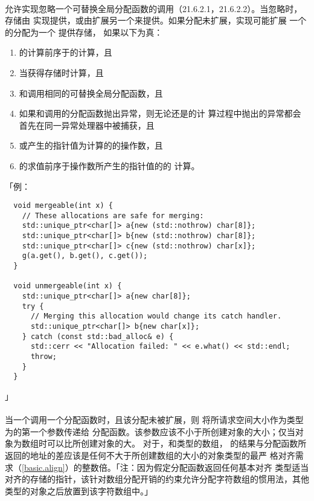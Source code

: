 \paragraph{}
允许实现忽略一个可替换全局分配函数的调用（21.6.2.1，21.6.2.2）。当忽略时，存储由
实现提供，或由扩展另一个来提供。如果分配未扩展，实现可能扩展
一个 的分配为一个 提供存储，
如果以下为真：
\begin{enumerate}
  \item{的计算前序于的计算，且}
  \item{当获得存储时计算，且}
  \item{和调用相同的可替换全局分配函数，且}
  \item{如果和调用的分配函数抛出异常，则无论还是的计
    算过程中抛出的异常都会首先在同一异常处理器中被捕获，且}
  \item{或产生的指针值为计算的的操作数，且}
  \item{的求值前序于操作数所产生的指针值的的
    计算。}
\end{enumerate}
「例：
\begin{lstlisting}
  void mergeable(int x) {
    // These allocations are safe for merging:
    std::unique_ptr<char[]> a{new (std::nothrow) char[8]};
    std::unique_ptr<char[]> b{new (std::nothrow) char[8]};
    std::unique_ptr<char[]> c{new (std::nothrow) char[x]};
    g(a.get(), b.get(), c.get());
  }

  void unmergeable(int x) {
    std::unique_ptr<char[]> a{new char[8]};
    try {
      // Merging this allocation would change its catch handler.
      std::unique_ptr<char[]> b{new char[x]};
    } catch (const std::bad_alloc& e) {
      std::cerr << "Allocation failed: " << e.what() << std::endl;
      throw;
    }
  }
\end{lstlisting}」

\paragraph{}
当一个调用一个分配函数时，且该分配未被扩展，则
将所请求空间大小作为类型为的第一个参数传递给
分配函数。该参数应该不小于所创建对象的大小；仅当对象为数组时可以比所创建对象的大。
对于，和类型的数组，
的结果与分配函数所返回的地址的差应该是任何不大于所创建数组的大小的对象类型的最严
格对齐需求（\ref{basic.align}）的整数倍。「注：因为假定分配函数返回任何基本对齐
类型适当对齐的存储的指针，该针对数组分配开销的约束允许分配字符数组的惯用法，其他
类型的对象之后放置到该字符数组中。」


